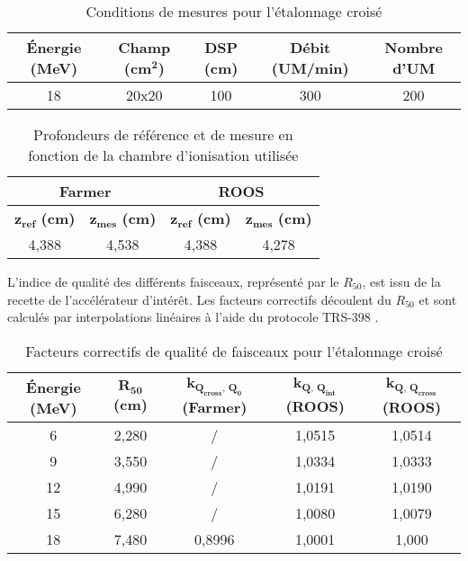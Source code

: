 \documentclass{article}
\begin{document}
\begin{table}[h]
  \centering
  \begin{tabular}{ccccc}
    \toprule
    \textbf{Énergie (MeV)} & \textbf{Champ (cm}$\mathbf{^2}$\textbf{)} & \textbf{DSP (cm)} & \textbf{Débit (UM/min)} & \textbf{Nombre d'UM} \\
    \toprule
    18 & 20x20 & 100 & 300 & 200\\
    \bottomrule
  \end{tabular}
  \caption{Conditions de mesures pour l'étalonnage croisé}
  \label{table_conditions_etal_croise}
\end{table}

\begin{table}[h!]
  \centering
  \begin{tabular}{|cc|cc|}
  \hline
  \multicolumn{2}{|c|}{\textbf{Farmer}} & \multicolumn{2}{c|}{\textbf{ROOS}} \\ \hline
  $\mathbf{z_{ref}}$ \textbf{(cm)} & $\mathbf{z_{mes}}$ \textbf{(cm)} & $\mathbf{z_{ref}}$ \textbf{(cm)} & $\mathbf{z_{mes}}$ \textbf{(cm)} \\ \hline
  4,388 & 4,538 & 4,388 & 4,278 \\ \hline
  \end{tabular}
  \caption{Profondeurs de référence et de mesure en fonction de la chambre d'ionisation utilisée}
  \label{table_profondeurs_mesures}
\end{table}

L'indice de qualité des différents faisceaux, représenté par le $R_{50}$, est issu de la recette de l'accélérateur d'intérêt. Les facteurs correctifs découlent du $R_{50}$ et sont calculés par interpolations linéaires à l'aide du protocole TRS-398 \cite{international2001iaea}.

\begin{table}[h]
  \centering
  \begin{tabular}{ccccc}
    \toprule
    \textbf{Énergie (MeV)} & $\mathbf{R_{50}}$ \textbf{(cm)} & $\mathbf{k_{Q_{cross},\, Q_0}}$ \textbf{(Farmer)} & $\mathbf{k_{Q,\, Q_{int}}}$ \textbf{(ROOS)} & $\mathbf{k_{Q,\, Q_{cross}}}$ \textbf{(ROOS)} \\
    \toprule
    6 & 2,280 & / & 1,0515 & 1,0514 \\
    9 & 3,550 & / & 1,0334 & 1,0333 \\
    12 & 4,990 & / & 1,0191 & 1,0190 \\
    15 & 6,280 & / & 1,0080 & 1,0079 \\
    18 & 7,480 & 0,8996 & 1,0001 & 1,000 \\
    \bottomrule
  \end{tabular}
  \caption{Facteurs correctifs de qualité de faisceaux pour l'étalonnage croisé}
  \label{table_facteurs_corr_etal}
\end{table}
\end{document}
